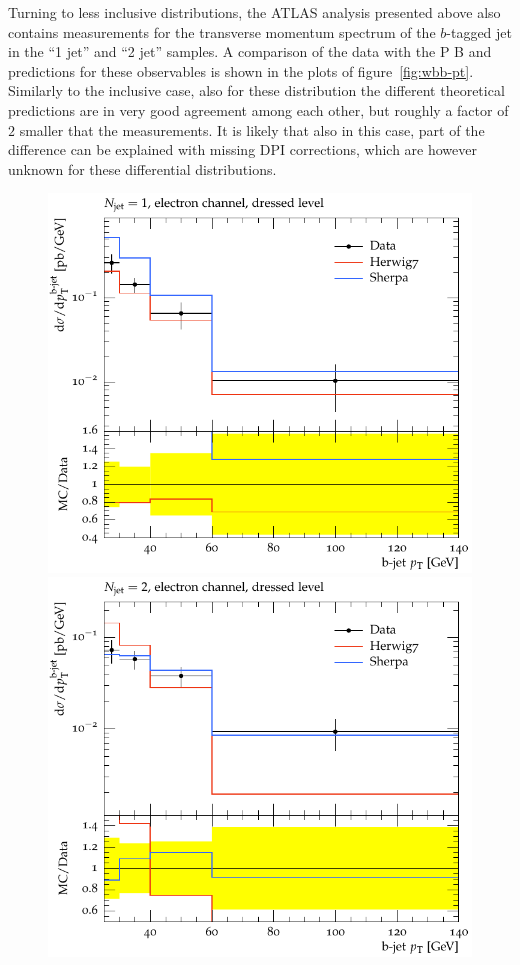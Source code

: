 \documentclass[11pt]{cernrep}
\newcommand{\POWHEGBOX}{P\protect\scalebox{0.8}{OWHEG} B\protect\scalebox{0.8}{OX}\xspace}
\begin{document}
Turning to less inclusive distributions, the ATLAS analysis presented
above also contains measurements for the transverse momentum spectrum
of the $b$-tagged jet in the ``1 jet'' and ``2 jet'' samples. A
comparison of the data with the \POWHEGBOX{} and \HERWIG predictions
for these observables is shown in the plots of
figure~\ref{fig:wbb-pt}. Similarly to the inclusive case, also for
these distribution the different theoretical predictions are in very
good agreement among each other, but roughly a factor of $2$ smaller
that the measurements. It is likely that also in this case, part of
the difference can be explained with missing DPI corrections, which
are however unknown for these differential distributions.


\begin{figure}[htbp]
\begin{center}
   \includegraphics[scale=0.65]{figs/wbb/sherpa/subtracted_h7_s22-1jet.pdf}
   \includegraphics[scale=0.65]{figs/wbb/sherpa/subtracted_h7_s22-2jet.pdf}

\end{center}
\end{figure}
\end{document}
